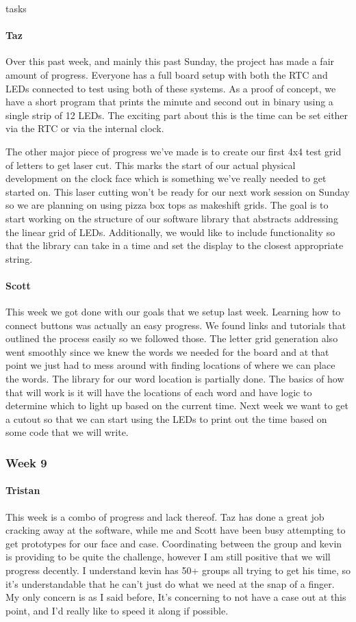 tasks\documentclass[onecolumn, draftclsnofoot,10pt, compsoc]{IEEEtran}
\begin{document}
\paragraph{Taz}
Over this past week, and mainly this past Sunday, the project has made a fair amount of progress. Everyone has a full board setup with both the RTC and LEDs connected to test using both of these systems. As a proof of concept, we have a short program that prints the minute and second out in binary using a single strip of 12 LEDs. The exciting part about this is the time can be set either via the RTC or via the internal clock.

The other major piece of progress we've made is to create our first 4x4 test grid of letters to get laser cut. This marks the start of our actual physical development on the clock face which is something we've really needed to get started on. This laser cutting won't be ready for our next work session on Sunday so we are planning on using pizza box tops as makeshift grids. The goal is to start working on the structure of our software library that abstracts addressing the linear grid of LEDs. Additionally, we would like to include functionality so that the library can take in a time and set the display to the closest appropriate string.
\paragraph{Scott}
This week we got done with our goals that we setup last week. Learning how to connect buttons was actually an easy progress. We found links and tutorials that outlined the process easily so we followed those. The letter grid generation also went smoothly since we knew the words we needed for the board and at that point we just had to mess around with finding locations of where we can place the words. The library for our word location is partially done. The basics of how that will work is it will have the locations of each word and have logic to determine which to light up based on the current time. Next week we want to get a cutout so that we can start using the LEDs to print out the time based on some code that we will write.
\subsubsection{Week 9}
\paragraph{Tristan}
This week is a combo of progress and lack thereof. Taz has done a great job cracking away at the software, while me and Scott have been busy attempting to get prototypes for our face and case. Coordinating between the group and kevin is providing to be quite the challenge, however I am still positive that we will progress decently. I understand kevin has 50+ groups all trying to get his time, so it's understandable that he can't just do what we need at the snap of a finger. My only concern is as I said before, It's concerning to not have a case out at this point, and I'd really like to speed it along if possible.
\end{document}
